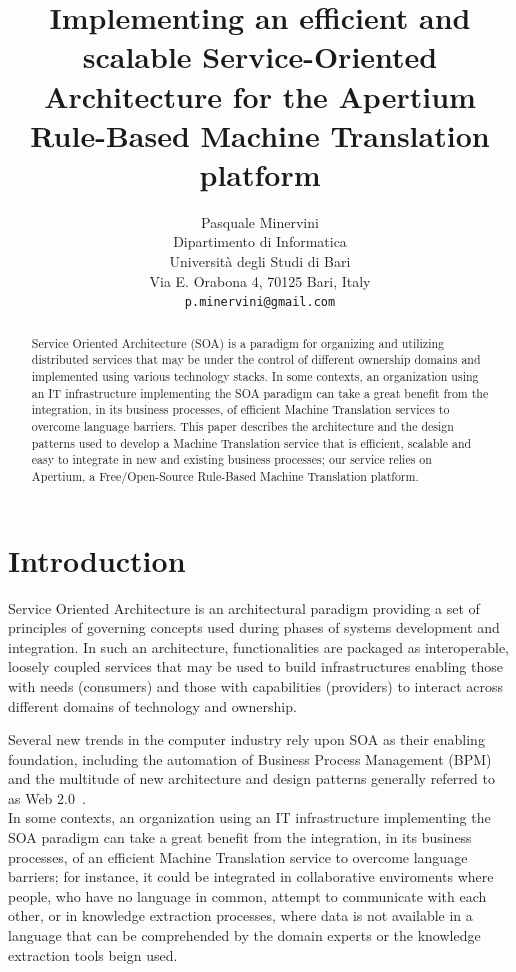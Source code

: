 \documentclass[11pt]{article}
\title{Implementing an efficient and scalable Service-Oriented Architecture for the Apertium Rule-Based Machine Translation platform}
\author{Pasquale Minervini\\
  Dipartimento di Informatica\\
  Università degli Studi di Bari\\
  Via E. Orabona 4, 70125 Bari, Italy\\
  {\tt p.minervini@gmail.com}}
\date{}
\begin{document}
\maketitle

\begin{abstract}
Service Oriented Architecture (SOA) is a paradigm for organizing and utilizing distributed services that may be under the  control of different ownership domains and implemented using various technology stacks. In some contexts, an organization using an IT infrastructure implementing the SOA paradigm can take a great benefit from the integration, in its business processes, of efficient Machine Translation services to overcome language barriers. This paper describes the architecture and the design patterns used to develop a Machine Translation service that is efficient, scalable and easy to integrate in new and existing business processes; our service relies on Apertium, a Free/Open-Source Rule-Based Machine Translation platform.
\end{abstract}


\section{Introduction}

Service Oriented Architecture is an architectural paradigm providing a set of principles of governing concepts used during phases of systems development and integration. In such an architecture, functionalities are packaged as interoperable, loosely coupled services that may be used to build infrastructures enabling those with needs (consumers) and those with capabilities (providers) to interact across different domains of technology and ownership.

Several new trends in the computer industry rely upon SOA as their enabling foundation, including the automation of Business Process Management (BPM) and the multitude of new architecture and design patterns generally referred to as Web 2.0~\citep{web20}.\\

In some contexts, an organization using an IT infrastructure implementing the SOA paradigm can take a great benefit from the integration, in its business processes, of an efficient Machine Translation service to overcome language barriers; for instance, it could be integrated in collaborative enviroments where people, who have no language in common, attempt to communicate with each other, or in knowledge extraction processes, where data is not available in a language that can be comprehended by the domain experts or the knowledge extraction tools beign used.
\end{document}
